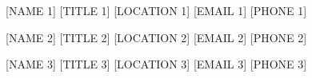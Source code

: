 %
%
%


\begin{referees}
                {[NAME 1]} 
                {[TITLE 1]}
                {[LOCATION 1]}
                {[EMAIL 1]}
                {[PHONE 1]} 

                {[NAME 2]}
                {[TITLE 2]}
                {[LOCATION 2]}
                {[EMAIL 2]}
                {[PHONE 2]}

                {[NAME 3]}
                {[TITLE 3]}
                {[LOCATION 3]}
                {[EMAIL 3]}
                {[PHONE 3]}
\end{referees}
